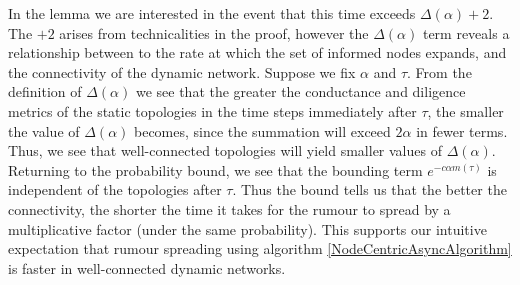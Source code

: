 \documentclass[a4paper,11pt]{article}
\theoremstyle{definition}
\begin{document}
In the lemma we are interested in the event that this time exceeds $\Delta(\alpha) + 2$. 
The  $+2$ arises from technicalities in the proof, however the $\Delta(\alpha)$ term reveals a relationship between to the rate at which the set of informed nodes expands, and the connectivity of the dynamic network. %
Suppose we fix $\alpha$ and $\tau$. From the definition of $\Delta(\alpha)$ we see that the greater the conductance and diligence metrics of the static topologies in the time steps immediately after $\tau$, the smaller the value of $\Delta(\alpha)$ becomes, since the summation will exceed $2\alpha$ in fewer terms. Thus, we see that well-connected topologies will yield smaller values of $\Delta(\alpha)$. Returning to the probability bound, we see that the bounding term $e^{-c\alpha m(\tau)}$ is independent of the topologies after $\tau$. Thus the bound tells us that the better the connectivity, the shorter the time it takes for the rumour to spread by a multiplicative factor (under the same probability). %
This supports our intuitive expectation that rumour spreading using algorithm \ref{NodeCentricAsyncAlgorithm} is faster in well-connected dynamic networks. %

\end{document}
